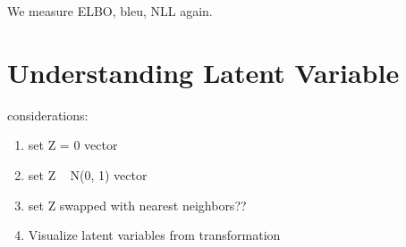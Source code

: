 We measure ELBO, bleu, NLL again.



\section{Understanding Latent Variable}

considerations:
\begin{enumerate}
	\item set Z = 0 vector
	\item set Z ~ N(0, 1) vector
	\item set Z swapped with nearest neighbors??
	\item Visualize latent variables from transformation
\end{enumerate}